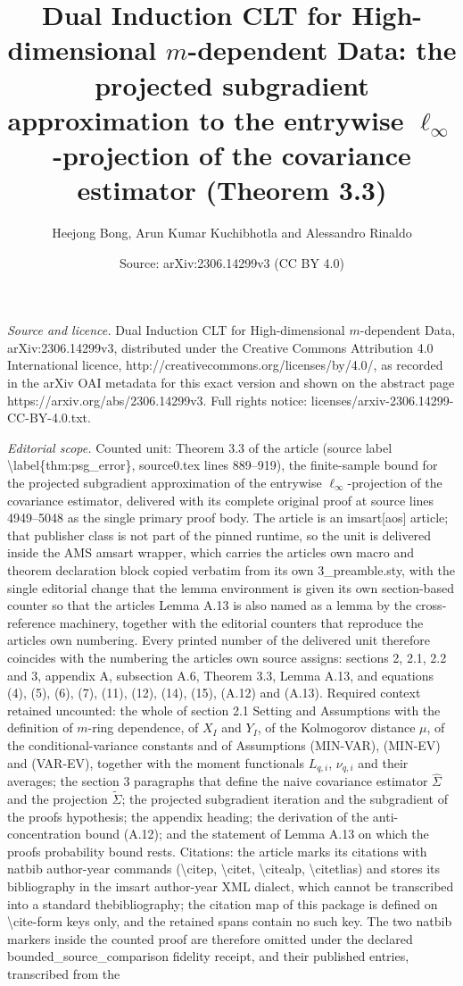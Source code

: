 \documentclass[10pt,a4paper]{amsart}
\title[Dual Induction CLT for high-dimensional m-dependent data: Theorem 3.3]{Dual Induction CLT for High-dimensional $m$-dependent Data: the projected subgradient approximation to the entrywise $\ell_\infty$-projection of the covariance estimator (Theorem 3.3)}
\author{Heejong Bong, Arun Kumar Kuchibhotla and Alessandro Rinaldo}
\date{Source: arXiv:2306.14299v3 (CC BY 4.0)}
\theoremstyle{plain}
\theoremstyle{remark}
\def\hat#1{\widehat{#1}}
\def\tilde#1{\widetilde{#1}}
\begin{document}
\maketitle
\noindent\emph{Source and licence.} Dual Induction CLT for High-dimensional $m$-dependent Data, arXiv:2306.14299v3, distributed under the Creative Commons Attribution 4.0 International licence, http://creativecommons.org/licenses/by/4.0/, as recorded in the arXiv OAI metadata for this exact version and shown on the abstract page https://arxiv.org/abs/2306.14299v3. Full rights notice: licenses/arxiv-2306.14299-CC-BY-4.0.txt.\par\smallskip
\noindent\textit{Editorial scope.} Counted unit: Theorem 3.3 of the article (source label \textbackslash{}label\{thm:psg\_error\}, source0.tex lines 889--919), the finite-sample bound for the projected subgradient approximation of the entrywise $\ell_\infty$-projection of the covariance estimator, delivered with its complete original proof at source lines 4949--5048 as the single primary proof body. The article is an imsart[aos] article; that publisher class is not part of the pinned runtime, so the unit is delivered inside the AMS amsart wrapper, which carries the article\textquotesingle s own macro and theorem declaration block copied verbatim from its own 3\_preamble.sty, with the single editorial change that the lemma environment is given its own section-based counter so that the article\textquotesingle s Lemma A.13 is also named as a lemma by the cross-reference machinery, together with the editorial counters that reproduce the article\textquotesingle s own numbering. Every printed number of the delivered unit therefore coincides with the numbering the article\textquotesingle s own source assigns: sections 2, 2.1, 2.2 and 3, appendix A, subsection A.6, Theorem 3.3, Lemma A.13, and equations (4), (5), (6), (7), (11), (12), (14), (15), (A.12) and (A.13). Required context retained uncounted: the whole of section 2.1 Setting and Assumptions with the definition of $m$-ring dependence, of $X_I$ and $Y_I$, of the Kolmogorov distance $\mu$, of the conditional-variance constants and of Assumptions (MIN-VAR), (MIN-EV) and (VAR-EV), together with the moment functionals $L_{q,i}$, $\nu_{q,i}$ and their averages; the section 3 paragraphs that define the naive covariance estimator $\hat\Sigma$ and the projection $\tilde\Sigma$; the projected subgradient iteration and the subgradient of the proof\textquotesingle s hypothesis; the appendix heading; the derivation of the anti-concentration bound (A.12); and the statement of Lemma A.13 on which the proof\textquotesingle s probability bound rests. Citations: the article marks its citations with natbib author-year commands (\textbackslash{}citep, \textbackslash{}citet, \textbackslash{}citealp, \textbackslash{}citetlias) and stores its bibliography in the imsart author-year XML dialect, which cannot be transcribed into a standard thebibliography; the citation map of this package is defined on \textbackslash{}cite-form keys only, and the retained spans contain no such key. The two natbib markers inside the counted proof are therefore omitted under the declared bounded\_source\_comparison fidelity receipt, and their published entries, transcribed from the 
\end{document}
